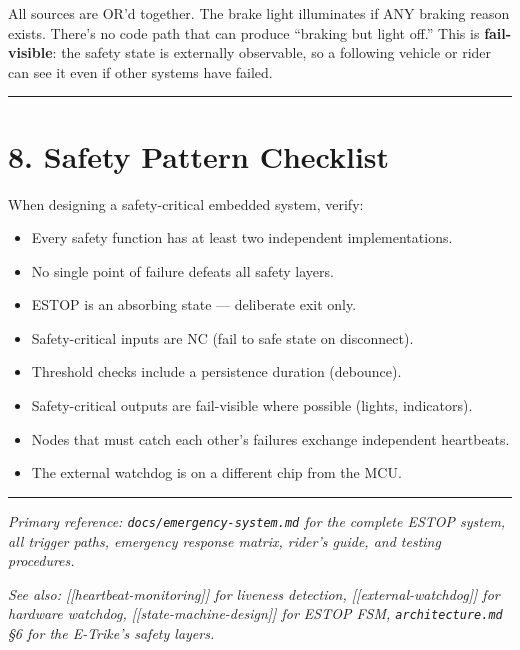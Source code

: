 \documentclass[12pt,a4paper,oneside]{report}
\providecommand{\tightlist}{\setlength{\itemsep}{0pt}\setlength{\parskip}{0pt}}
\begin{document}
All sources are OR'd together. The brake light illuminates if ANY braking reason
exists. There's no code path that can produce ``braking but light off.'' This is
\textbf{fail-visible}: the safety state is externally observable, so a following
vehicle or rider can see it even if other systems have failed.

\begin{center}\rule{0.5\linewidth}{0.5pt}\end{center}

\section{8. Safety Pattern Checklist}\label{safety-pattern-checklist}

When designing a safety-critical embedded system, verify:

\begin{itemize}
\tightlist
\item[$\square$]
  Every safety function has at least two independent implementations.
\item[$\square$]
  No single point of failure defeats all safety layers.
\item[$\square$]
  ESTOP is an absorbing state --- deliberate exit only.
\item[$\square$]
  Safety-critical inputs are NC (fail to safe state on disconnect).
\item[$\square$]
  Threshold checks include a persistence duration (debounce).
\item[$\square$]
  Safety-critical outputs are fail-visible where possible (lights, indicators).
\item[$\square$]
  Nodes that must catch each other's failures exchange independent heartbeats.
\item[$\square$]
  The external watchdog is on a different chip from the MCU.
\end{itemize}

\begin{center}\rule{0.5\linewidth}{0.5pt}\end{center}

\emph{Primary reference: \texttt{docs/emergency-system.md} for the complete
ESTOP system, all trigger paths, emergency response matrix, rider's guide, and
testing procedures.}

\emph{See also: {[}{[}heartbeat-monitoring{]}{]} for liveness detection,
{[}{[}external-watchdog{]}{]} for hardware watchdog,
{[}{[}state-machine-design{]}{]} for ESTOP FSM, \texttt{architecture.md} §6 for
the E-Trike's safety layers.}
\end{document}
